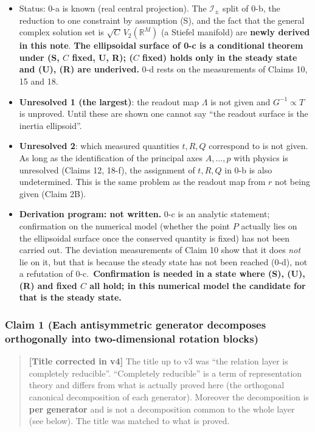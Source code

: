 \documentclass[
  10pt,
]{article}
\providecommand{\tightlist}{%
  \setlength{\itemsep}{0pt}\setlength{\parskip}{0pt}}
\begin{document}
\begin{itemize}
\tightlist
\item
  Status: 0-a is known (real central projection). The
  \(\mathcal{I}_\pm\) split of 0-b, the reduction to one constraint by
  assumption (S), and the fact that the general complex solution set is
  \(\sqrt{C}\,V_2(\mathbb{R}^M)\) (a Stiefel manifold) are \textbf{newly
  derived in this note}. \textbf{The ellipsoidal surface of 0-c is a
  conditional theorem under (S, \(C\) fixed, U, R); (\(C\) fixed) holds
  only in the steady state and (U), (R) are underived.} 0-d rests on the
  measurements of Claims 10, 15 and 18.
\item
  \textbf{Unresolved 1 (the largest)}: the readout map \(\Lambda\) is
  not given and \(G^{-1}\propto T\) is unproved. Until these are shown
  one cannot say ``the readout surface is the inertia ellipsoid''.
\item
  \textbf{Unresolved 2}: which measured quantities \(t, R, Q\)
  correspond to is not given. As long as the identification of the
  principal axes \(A,\dots,p\) with physics is unresolved (Claims 12,
  18-f), the assignment of \(t, R, Q\) in 0-b is also undetermined. This
  is the same problem as the readout map from \(r\) not being given
  (Claim 2B).
\item
  \textbf{Derivation program: not written.} 0-c is an analytic
  statement; confirmation on the numerical model (whether the point
  \(P\) actually lies on the ellipsoidal surface once the conserved
  quantity is fixed) has not been carried out. The deviation
  measurements of Claim 10 show that it does \emph{not} lie on it, but
  that is because the steady state has not been reached (0-d), not a
  refutation of 0-c.~\textbf{Confirmation is needed in a state where
  (S), (U), (R) and fixed \(C\) all hold; in this numerical model the
  candidate for that is the steady state.}
\end{itemize}

\subsubsection{Claim 1 (Each antisymmetric generator decomposes
orthogonally into two-dimensional rotation
blocks)}\label{claim-1-each-antisymmetric-generator-decomposes-orthogonally-into-two-dimensional-rotation-blocks}

\begin{quote}
\textbf{{[}Title corrected in v4{]}} The title up to v3 was ``the
relation layer is completely reducible''. ``Completely reducible'' is a
term of representation theory and differs from what is actually proved
here (the orthogonal canonical decomposition of each generator).
Moreover the decomposition is \textbf{per generator} and is not a
decomposition common to the whole layer (see below). The title was
matched to what is proved.
\end{quote}
\end{document}
